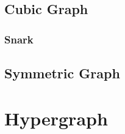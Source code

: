\subsection{Cubic Graph} \label{sec:cubic_graph}

\subsubsection{Snark} \label{sec:snark}



\subsection{Symmetric Graph} \label{sec:symmetric_graph}



\section{Hypergraph} \label{sec:hypergraph}
